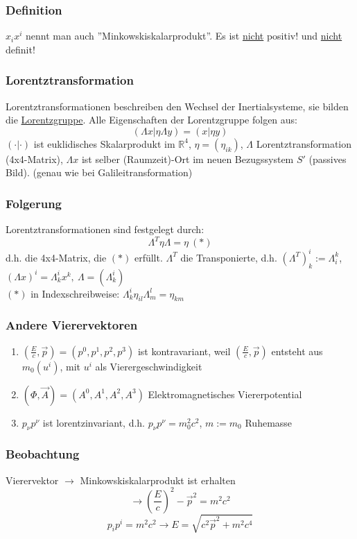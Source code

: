 \documentclass[twoside,a4paper]{scrartcl}
\newcommand{\R}{\mathbb{R}}
\renewcommand{\1}{\mathds{1}}
\newcommand{\ra}{\rightarrow}
\renewcommand{\L}{\Lambda}
\renewcommand{\R}{\mathbb{R}}
\begin{document}
\subsubsection*{Definition}
 $x_ix^i$ nennt man auch ''Minkowskiskalarprodukt''. Es ist \underline{nicht} positiv! und \underline{nicht} definit!
\subsubsection*{Lorentztransformation}
Lorentztransformationen beschreiben den Wechsel der Inertialsysteme, sie bilden die \underline{Lorentzgruppe}. Alle Eigenschaften der Lorentzgruppe folgen aus:
$$(\L x|\eta\L y)=(x|\eta y)$$
$(\cdot|\cdot)$ ist euklidisches Skalarprodukt im $\R^4$, $\eta=(\eta_{ik})$, $\L$ Lorentztransformation (4x4-Matrix), $\L x$ ist selber (Raumzeit)-Ort im neuen Bezugssystem $S'$ (passives Bild). (genau wie bei Galileitransformation)
\subsubsection*{Folgerung}
Lorentztransformationen sind festgelegt durch:
$$\L ^T \eta \L = \eta \ (*)$$
d.h. die 4x4-Matrix, die $(*)$ erfüllt. $\L^T$ die Transponierte, d.h. $(\L^T)_k^i:=\L_i^k$, $(\L x)^i=\L_k^i x^k, \ \L=(\L_k^i)$\\
$(*)$ in Indexschreibweise: $\L_k^i \eta_{il} \L_m^l=\eta_{km}$
\subsubsection*{Andere Vierervektoren}
\begin{enumerate}
\item $(\frac{E}{c},\vec p)=(p^0,p^1,p^2,p^3)$ ist kontravariant, weil $(\frac{E}{c},\vec p)$ entsteht aus $m_0(u^i)$, mit $u^i$ als Vierergeschwindigkeit
\item $(\Phi,\vec A)=(A^0,A^1,A^2,A^3)$ Elektromagnetisches Viererpotential
\item $p_\nu p^\nu$ ist lorentzinvariant, d.h. $p_\nu p^\nu=m_0^2c^2$, $m:=m_0$ Ruhemasse
\end{enumerate}
\subsubsection*{Beobachtung}
Vierervektor $\ra$ Minkowskiskalarprodukt ist erhalten
$$\ra (\frac{E}{c})^2-\vec p^2=m^2c^2$$
$$p_ip^i=m^2c^2 \ra E=\sqrt{c^2\vec p^2+m^2c^4}$$
\end{document}
